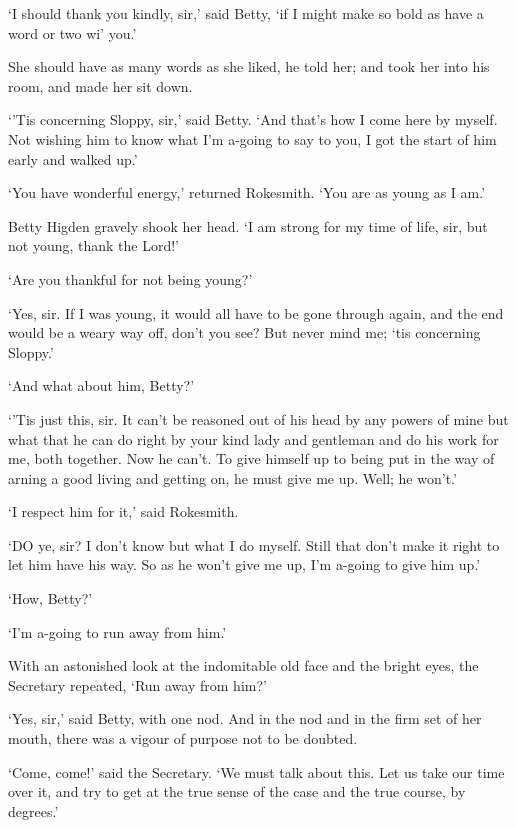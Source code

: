 ‘I should thank you kindly, sir,’ said Betty, ‘if I might make so bold
as have a word or two wi’ you.’

She should have as many words as she liked, he told her; and took her
into his room, and made her sit down.

‘’Tis concerning Sloppy, sir,’ said Betty. ‘And that’s how I come here
by myself. Not wishing him to know what I’m a-going to say to you, I got
the start of him early and walked up.’

‘You have wonderful energy,’ returned Rokesmith. ‘You are as young as I
am.’

Betty Higden gravely shook her head. ‘I am strong for my time of life,
sir, but not young, thank the Lord!’

‘Are you thankful for not being young?’

‘Yes, sir. If I was young, it would all have to be gone through again,
and the end would be a weary way off, don’t you see? But never mind me;
‘tis concerning Sloppy.’

‘And what about him, Betty?’

‘’Tis just this, sir. It can’t be reasoned out of his head by any powers
of mine but what that he can do right by your kind lady and gentleman
and do his work for me, both together. Now he can’t. To give himself up
to being put in the way of arning a good living and getting on, he must
give me up. Well; he won’t.’

‘I respect him for it,’ said Rokesmith.

‘DO ye, sir? I don’t know but what I do myself. Still that don’t make it
right to let him have his way. So as he won’t give me up, I’m a-going to
give him up.’

‘How, Betty?’

‘I’m a-going to run away from him.’

With an astonished look at the indomitable old face and the bright eyes,
the Secretary repeated, ‘Run away from him?’

‘Yes, sir,’ said Betty, with one nod. And in the nod and in the firm set
of her mouth, there was a vigour of purpose not to be doubted.

‘Come, come!’ said the Secretary. ‘We must talk about this. Let us take
our time over it, and try to get at the true sense of the case and the
true course, by degrees.’

